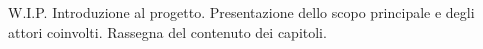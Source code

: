 W.I.P.
Introduzione al progetto. Presentazione dello scopo principale e degli attori coinvolti. Rassegna del contenuto dei capitoli.